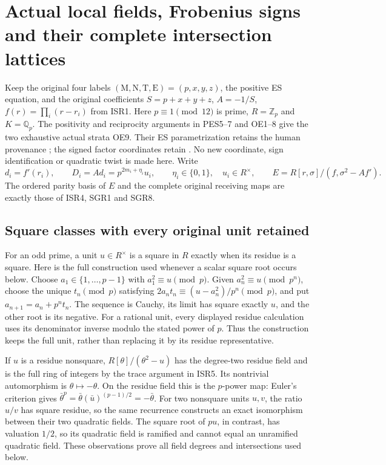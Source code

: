 \section{Actual local fields, Frobenius signs and their complete intersection lattices}
Keep the original four labels $(\mathrm M,\mathrm N,\mathrm T,\mathrm E)
=(p,x,y,z)$, the positive ES equation, and the original coefficients
$S=p+x+y+z$, $A=-1/S$, $f(r)=\prod_i(r-r_i)$ from ISR1.
Here $p\equiv1\pmod {12}$ is prime, $R=\mathbb Z_p$ and
$K=\mathbb Q_p$. The positivity and reciprocity arguments in
PES5--7 and OE1--8 give the two exhaustive actual strata OE9.
Their ES parametrization retains the human provenance
\cite[Section 2, Type I and Type II parametrizations]{ElsholtzTao2015};
the signed factor coordinates retain \cite{ES488,Tao}.
No new coordinate, sign identification or quadratic twist is made here.
Write
\[
 d_i=f'(r_i),\qquad D_i=A d_i=p^{2m_i+\eta_i}u_i,
 \qquad \eta_i\in\{0,1\},\quad u_i\in R^\times,\qquad
 E=R[r,\sigma]/(f,\sigma^2-Af').                    \tag{SLF1}
\]
The ordered parity basis of $E$ and the complete original receiving
maps are exactly those of ISR4, SGR1 and SGR8.

\subsection{Square classes with every original unit retained}
For an odd prime, a unit $u\in R^\times$ is a square in $R$ exactly
when its residue is a square. Here is the full construction used
whenever a scalar square root occurs below. Choose
$a_1\in\{1,\ldots,p-1\}$ with $a_1^2\equiv u\pmod p$. Given
$a_n^2\equiv u\pmod {p^n}$, choose the unique $t_n\pmod p$ satisfying
$2a_nt_n\equiv(u-a_n^2)/p^n\pmod p$, and put
$a_{n+1}=a_n+p^nt_n$. The sequence is Cauchy, its limit has square
exactly $u$, and the other root is its negative. For a rational unit,
every displayed residue calculation uses its denominator inverse
modulo the stated power of $p$. Thus the construction keeps the full
unit, rather than replacing it by its residue representative.

If $u$ is a residue nonsquare, $R[\theta]/(\theta^2-u)$ has the
degree-two residue field and is the full ring of integers by the
trace argument in ISR5. Its nontrivial automorphism is
$\theta\mapsto-\theta$. On the residue field this is the
$p$-power map: Euler's criterion gives
$\bar\theta^p=\bar\theta(\bar u)^{(p-1)/2}=-\bar\theta$.
For two nonsquare units $u,v$, the ratio $u/v$ has square residue,
so the same recurrence constructs an exact isomorphism between
their two quadratic fields. The square root of $pu$, in contrast,
has valuation $1/2$, so its quadratic field is ramified and cannot
equal an unramified quadratic field. These observations prove all
field degrees and intersections used below.

